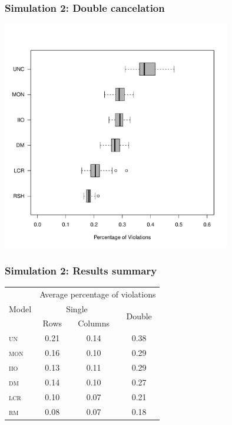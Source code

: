 \documentclass[10pt,serif,professionalfont]{beamer}
\begin{document}
\begin{frame}
    \frametitle{Simulation 2: Double cancelation}

    \centering \includegraphics[width=0.75\textwidth]{./figs/violations_dc_weighted.pdf}

\end{frame}

\begin{frame}
    \frametitle{Simulation 2: Results summary}

    \begin{center}
    \begin{tabular}{lccc}
    \toprule
     \multirow{3}{*}{Model} & \multicolumn{3}{c}{Average percentage of violations} \\ \cmidrule(lr){2-4}
                & \multicolumn{2}{c}{Single} & \multirow{2}{*}{Double} \\ \cmidrule(lr){2-3}
                  & Rows       & Columns    &            \\

    \midrule
     \textsc{un}  & 0.21 & 0.14 & 0.38 \\
     \textsc{mon} & 0.16 & 0.10 & 0.29 \\
     \textsc{iio} & 0.13 & 0.11 & 0.29 \\
     \textsc{dm}  & 0.14 & 0.10 & 0.27 \\
     \textsc{lcr} & 0.10 & 0.07 & 0.21 \\
     \textsc{rm}  & 0.08 & 0.07 & 0.18 \\
    \bottomrule
    \end{tabular}
    \end{center}


\end{frame}
\end{document}
